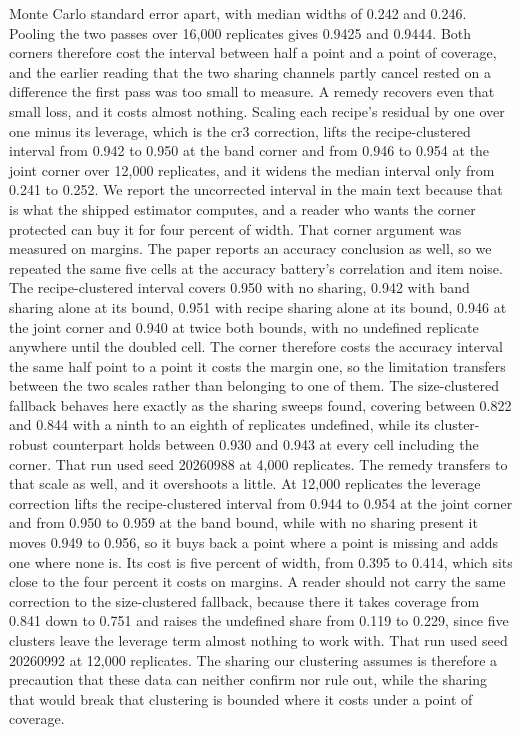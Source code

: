 Monte Carlo standard error apart, with median widths of 0.242 and 0.246. Pooling the two passes over 16,000 replicates gives 0.9425 and 0.9444. Both corners therefore cost the interval between half a point and a point of coverage, and the earlier reading that the two sharing channels partly cancel rested on a difference the first pass was too small to measure. A remedy recovers even that small loss, and it costs almost nothing. Scaling each recipe's residual by one over one minus its leverage, which is the cr3 correction, lifts the recipe-clustered interval from 0.942 to 0.950 at the band corner and from 0.946 to 0.954 at the joint corner over 12,000 replicates, and it widens the median interval only from 0.241 to 0.252. We report the uncorrected interval in the main text because that is what the shipped estimator computes, and a reader who wants the corner protected can buy it for four percent of width. That corner argument was measured on margins. The paper reports an accuracy conclusion as well, so we repeated the same five cells at the accuracy battery's correlation and item noise. The recipe-clustered interval covers 0.950 with no sharing, 0.942 with band sharing alone at its bound, 0.951 with recipe sharing alone at its bound, 0.946 at the joint corner and 0.940 at twice both bounds, with no undefined replicate anywhere until the doubled cell. The corner therefore costs the accuracy interval the same half point to a point it costs the margin one, so the limitation transfers between the two scales rather than belonging to one of them. The size-clustered fallback behaves here exactly as the sharing sweeps found, covering between 0.822 and 0.844 with a ninth to an eighth of replicates undefined, while its cluster-robust counterpart holds between 0.930 and 0.943 at every cell including the corner. That run used seed 20260988 at 4,000 replicates. The remedy transfers to that scale as well, and it overshoots a little. At 12,000 replicates the leverage correction lifts the recipe-clustered interval from 0.944 to 0.954 at the joint corner and from 0.950 to 0.959 at the band bound, while with no sharing present it moves 0.949 to 0.956, so it buys back a point where a point is missing and adds one where none is. Its cost is five percent of width, from 0.395 to 0.414, which sits close to the four percent it costs on margins. A reader should not carry the same correction to the size-clustered fallback, because there it takes coverage from 0.841 down to 0.751 and raises the undefined share from 0.119 to 0.229, since five clusters leave the leverage term almost nothing to work with. That run used seed 20260992 at 12,000 replicates. The sharing our clustering assumes is therefore a precaution that these data can neither confirm nor rule out, while the sharing that would break that clustering is bounded where it costs under a point of coverage.

